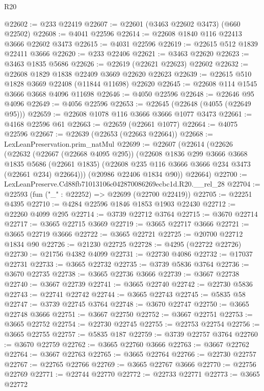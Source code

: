 \begin{lexlean}{R20}
\begin{coremodule}
@22602 := @233 @22419
@22607 := @22601 (@3463 @22602 @3473) (@660 @22502)
@22608 := @4041 @22596
@22614 := @22608 @1840 @116 @22413 @3666 @22602 @3473
@22615 := @4031 @22596
@22619 := @22615 @512 @1839 @22411 @3666
@22620 := @233 @22406
@22621 := @3463 @22620
@22623 := @3463 @1835 @5686
@22626 := @22619 (@22621 @22623) @22602
@22632 := @22608 @1829 @1838 @22409 @3669 @22620 @22623
@22639 := @22615 @510 @1828 @3669 @22408 (@11844 @11698) @22620
@22645 := @22608 @114 @1545 @3666 @3668 @4096 @11698
@22646 := @4050 @22596
@22648 := @22646 @95 @4096
@22649 := @4056 @22596
@22653 := @22645 (@22648 (@4055 (@22649 @95)))
@22659 := @22608 @1078 @116 @3666 @3666 @1077 @3473
@22661 := @4168 @22596 @61
@22663 := @22659 (@22661 @1077)
@22664 := @4075 @22596
@22667 := @22639 (@22653 (@22663 @22664))
@22668 := LexLeanPreservation.prim_natMul
@22699 := @22607
    (@22614
      (@22626
        (@22632
          (@22667 (@22668 @4095 @295))
          (@22608
            @1836
            @299
            @3666
            @3668
            @1835
            @5686
            (@22661 @1835)
            (@22608 @235 @116 @3666 @3666 @234 @3473 (@22661 @234) @22664)))
        (@20986 @22406 @1834 @90))
      @22664)
@22700 := LexLeanPreserve.Cd88fb71013106c042870086269ecbc1d.R20.__rel_28
@22704 := @22593 (fun ("_" : @22252) => @22699 (@22700 @22419))
@22705 := @22251 @4395
@22710 := @4284 @22596 @1846 @1853 @1903 @22430
@22712 := @22260 @4099 @295
@22714 := @3739 @22712 @3764
@22715 := @3670 @22714
@22717 := @3665 @22715 @3669
@22719 := @3665 @22717 @3666
@22721 := @3665 @22719 @3666
@22722 := @3665 @22721
@22725 := @20700 @22712 @1834 @90
@22726 := @21230 @22725
@22728 := @4295 (@22722 @22726)
@22730 := @21756 @4382 @4099
@22731 := @22730 @4086
@22732 := @17037 @22731
@22733 := @3665 @22732
@22735 := @3739 @5836 @3764
@22736 := @3670 @22735
@22738 := @3665 @22736 @3666
@22739 := @3667 @22738
@22740 := @3667 @22739
@22741 := @3665 @22740
@22742 := @22730 @5836
@22743 := @22741 @22742
@22744 := @3665 @22743
@22745 := @5835 @58
@22747 := @3739 @22745 @3764
@22748 := @3670 @22747
@22750 := @3665 @22748 @3666
@22751 := @3667 @22750
@22752 := @3667 @22751
@22753 := @3665 @22752
@22754 := @22730 @22745
@22755 := @22753 @22754
@22756 := @3665 @22755
@22757 := @5835 @187
@22759 := @3739 @22757 @3764
@22760 := @3670 @22759
@22762 := @3665 @22760 @3666
@22763 := @3667 @22762
@22764 := @3667 @22763
@22765 := @3665 @22764
@22766 := @22730 @22757
@22767 := @22765 @22766
@22769 := @3665 @22767 @3666
@22770 := @22756 @22769
@22771 := @22744 @22770
@22772 := @22733 @22771
@22773 := @3665 @22772

\end{coremodule}
\end{lexlean}
